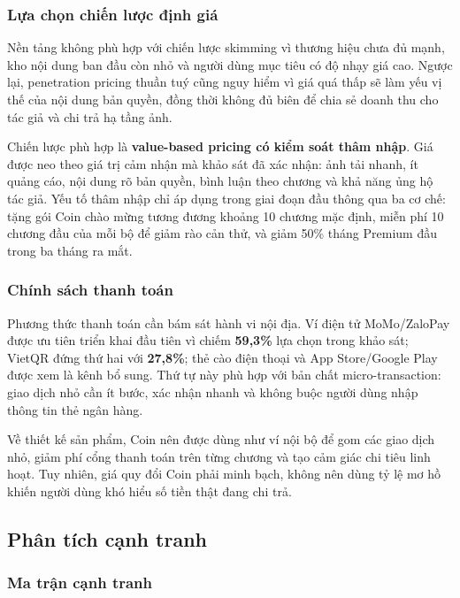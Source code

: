 \subsubsection{Lựa chọn chiến lược định giá}

Nền tảng không phù hợp với chiến lược skimming vì thương hiệu chưa đủ mạnh, kho nội dung ban đầu còn nhỏ và người dùng mục tiêu có độ nhạy giá cao. Ngược lại, penetration pricing thuần tuý cũng nguy hiểm vì giá quá thấp sẽ làm yếu vị thế của nội dung bản quyền, đồng thời không đủ biên để chia sẻ doanh thu cho tác giả và chi trả hạ tầng ảnh.

Chiến lược phù hợp là \textbf{value-based pricing có kiểm soát thâm nhập}. Giá được neo theo giá trị cảm nhận mà khảo sát đã xác nhận: ảnh tải nhanh, ít quảng cáo, nội dung rõ bản quyền, bình luận theo chương và khả năng ủng hộ tác giả. Yếu tố thâm nhập chỉ áp dụng trong giai đoạn đầu thông qua ba cơ chế: tặng gói Coin chào mừng tương đương khoảng 10 chương mặc định, miễn phí 10 chương đầu của mỗi bộ để giảm rào cản thử, và giảm 50\% tháng Premium đầu trong ba tháng ra mắt.

\subsubsection{Chính sách thanh toán}

Phương thức thanh toán cần bám sát hành vi nội địa. Ví điện tử MoMo/ZaloPay được ưu tiên triển khai đầu tiên vì chiếm \textbf{59{,}3\%} lựa chọn trong khảo sát; VietQR đứng thứ hai với \textbf{27{,}8\%}; thẻ cào điện thoại và App Store/Google Play được xem là kênh bổ sung. Thứ tự này phù hợp với bản chất micro-transaction: giao dịch nhỏ cần ít bước, xác nhận nhanh và không buộc người dùng nhập thông tin thẻ ngân hàng.

Về thiết kế sản phẩm, Coin nên được dùng như ví nội bộ để gom các giao dịch nhỏ, giảm phí cổng thanh toán trên từng chương và tạo cảm giác chi tiêu linh hoạt. Tuy nhiên, giá quy đổi Coin phải minh bạch, không nên dùng tỷ lệ mơ hồ khiến người dùng khó hiểu số tiền thật đang chi trả.

\subsection{Phân tích cạnh tranh}

\subsubsection{Ma trận cạnh tranh}

